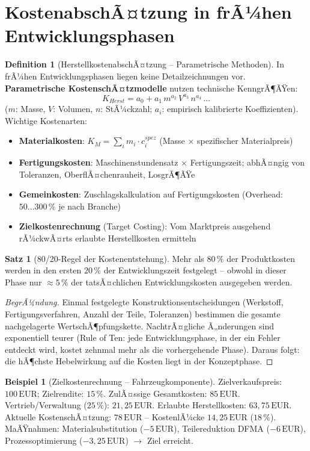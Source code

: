 ﻿\documentclass[a4paper,12pt]{report}
\theoremstyle{definition}
\newtheorem{definition}{Definition}
\newtheorem{beispiel}{Beispiel}
\newtheorem{satz}{Satz}
\begin{document}
\section{KostenabschÃ¤tzung in frÃ¼hen Entwicklungsphasen}

\begin{definition}[HerstellkostenabschÃ¤tzung -- Parametrische Methoden]
In frÃ¼hen Entwicklungsphasen liegen keine Detailzeichnungen vor.
\textbf{Parametrische KostenschÃ¤tzmodelle} nutzen technische KenngrÃ¶ÃŸen:
\[
  K_{Herst} = a_0 + a_1\,m^{a_2}\,V^{a_3}\,n^{a_4}\,\ldots
\]
($m$: Masse, $V$: Volumen, $n$: StÃ¼ckzahl; $a_i$: empirisch kalibrierte Koeffizienten).
Wichtige Kostenarten:
\begin{itemize}
    \item[-] \textbf{Materialkosten}: $K_M = \sum_i m_i \cdot c_i^{spez}$
          (Masse $\times$ spezifischer Materialpreis)
    \item[-] \textbf{Fertigungskosten}: Maschinenstundensatz $\times$ Fertigungszeit;
          abhÃ¤ngig von Toleranzen, OberflÃ¤chenrauheit, LosgrÃ¶ÃŸe
    \item[-] \textbf{Gemeinkosten}: Zuschlagskalkulation auf Fertigungskosten
          (Overhead: $50\ldots300\,\%$ je nach Branche)
    \item[-] \textbf{Zielkostenrechnung} (Target Costing): Vom Marktpreis
          ausgehend rÃ¼ckwÃ¤rts erlaubte Herstellkosten ermitteln
\end{itemize}
\end{definition}

\begin{satz}[80/20-Regel der Kostenentstehung]
Mehr als $80\,\%$ der Produktkosten werden in den ersten $20\,\%$
der Entwicklungszeit festgelegt -- obwohl in dieser Phase nur
$\approx 5\,\%$ der tatsÃ¤chlichen Entwicklungskosten ausgegeben werden.
\end{satz}
\begin{proof}[BegrÃ¼ndung]
Einmal festgelegte Konstruktionsentscheidungen (Werkstoff, Fertigungsverfahren,
Anzahl der Teile, Toleranzen) bestimmen die gesamte nachgelagerte WertschÃ¶pfungskette.
NachtrÃ¤gliche Ã„nderungen sind exponentiell teurer (Rule of Ten:
jede Entwicklungsphase, in der ein Fehler entdeckt wird, kostet zehnmal mehr
als die vorhergehende Phase). Daraus folgt: die hÃ¶chste Hebelwirkung
auf die Kosten liegt in der Konzeptphase.
\end{proof}

\begin{beispiel}[Zielkostenrechnung -- Fahrzeugkomponente]
Zielverkaufspreis: $100\,\mathrm{EUR}$; Zielrendite: $15\,\%$.
ZulÃ¤ssige Gesamtkosten: $85\,\mathrm{EUR}$.
Vertrieb/Verwaltung ($25\,\%$): $21{,}25\,\mathrm{EUR}$.
Erlaubte Herstellkosten: $63{,}75\,\mathrm{EUR}$.
Aktuelle KostenschÃ¤tzung: $78\,\mathrm{EUR}$ -- KostenlÃ¼cke $14{,}25\,\mathrm{EUR}$ ($18\,\%$).
MaÃŸnahmen: Materialsubstitution ($-5\,\mathrm{EUR}$), Teilereduktion DFMA ($-6\,\mathrm{EUR}$),
Prozessoptimierung ($-3{,}25\,\mathrm{EUR}$) $\to$ Ziel erreicht.
\end{beispiel}
\end{document}
